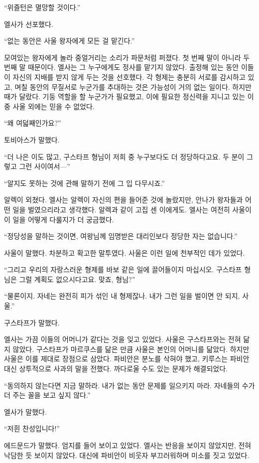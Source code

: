 ``위즐턴은 멸망할 것이다.''

엘사가 선포했다.

``없는 동안은 사울 왕자에게 모든 걸 맡긴다.''

모여있는 왕자에게 놀라 중얼거리는 소리가 파문처럼 퍼졌다. 첫 번째 말이 아니라 두 번째 말 때문이다. 엘사는 그 누구에게도 정사를 맡기지 않았다. 출정해 있는 동안 이들이 자신의 지배를 받지 않게 두는 것을 선호했다. 각 형제는 충분히 서로를 감시하고 있고, 며칠 동안의 무질서로 누군가를 추대하는 것은 가능성이 거의 없는 일이다. 하지만 때가 달랐다. 기둥 역할을 할 누군가가 필요했고, 이에 필요한 정신력을 지니고 있는 이 중 사울 외에는 믿을 수 없었다.

``왜 여덟째인가요?''

토비아스가 말했다.

``더 나은 이도 많고, 구스타프 형님이 저희 중 누구보다도 더 정당하다고요. 두 분이 그렇고 그런 사이여서—''

``알지도 못하는 것에 관해 말하기 전에 그 입 다무시죠.''

알렉이 외쳤다. 엘사는 알렉이 자신의 편을 들어준 것에 놀랐지만, 안나가 왕자들과 어떤 일을 벌였으리라고 생각했다. 알렉과 같이 고집 센 이에게도. 엘사는 여전히 사울이 이 일을 어떻게 다룰지가 더 궁금했다.

``정당성을 말하는 것이면, 여왕님께 임명받은 대리인보다 정당한 자는 없습니다.''

사울이 말했다. 차분하고 확고한 말투였다. 사울은 이런 일에 천부적인 데가 있었다.

``그리고 우리의 자랑스러운 형제를 바보 같은 일에 끌어들이지 마십시오. 구스타프 형님은 그럴 계획도 없으시다고요. 맞죠, 형님?''

``물론이지. 자네는 완전히 피가 섞인 내 형제잖나. 내가 그런 일을 벌이면 안 되지, 사울.''

구스타프가 말했다.

엘사는 가끔 이들의 어머니가 같다는 것을 잊고 있었다. 사울은 구스타프와는 전혀 닮지 않았다. 구스타프가 마르쿠스를 닮은 만큼 사울은 본인의 어머니를 닮았다. 하지만 사울은 이를 제대로 장점으로 삼았다. 파비안은 분노를 삭혀야 했고, 키루스는 파비안 대신 상투적으로 사과의 말을 전했다. 까다로울 수도 있는 문제가 해결되었다.

``동의하지 않는다면 지금 말하라. 내가 없는 동안 문제를 일으키지 마라. 자네들의 수가 더 주는 꼴을 보고 싶지 않다.''

엘사가 말했다.

``저흰 찬성입니다!''

에드문드가 말했다. 엄지를 들어 보이고 있었다. 엘사는 반응을 보이지 않았지만, 전혀 낙담한 듯 보이지 않았다. 대신에 파비안이 비웃자 부끄러워하며 미소를 짓고 있었다.

